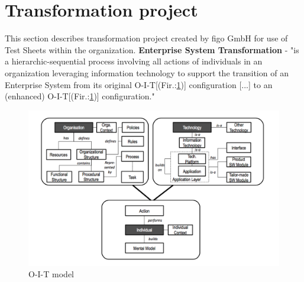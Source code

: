 


\section{Transformation project}
\label{sec:transP}
This section describes transformation project created by figo GmbH for use of Test Sheets within the organization.
\textbf{Enterprise System Transformation} -  "is a hierarchic-sequential process involving all actions of individuals in an organization leveraging information technology to support the transition of an Enterprise System from its original O-I-T[(Fir.:\ref{fig:oit})] configuration [...] to an (enhanced) O-I-T[(Fir.:\ref{fig:oit})] configuration."\cite{MES5}

\begin{figure}[ht]
	\label{fig:oit}
	\centering
	\includegraphics[width=\textwidth]{grafiken/oit.png}
	\caption{O-I-T model\cite{MES5}}
\end{figure}

